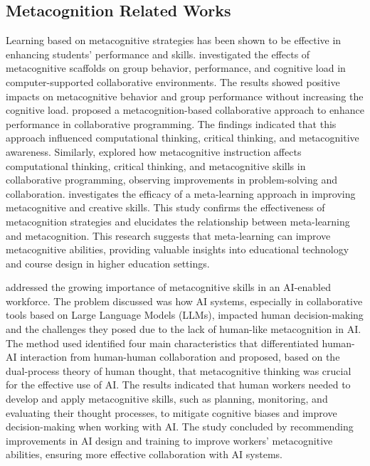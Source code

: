 \documentclass[a4paper,twoside]{article}
\begin{document}
\subsection{Metacognition Related Works}

Learning based on metacognitive strategies has been shown to be effective in
enhancing students’ performance and skills. \cite{Zheng19} investigated the
effects of metacognitive scaffolds on group behavior, performance, and cognitive
load in computer-supported collaborative environments. The results showed
positive impacts on metacognitive behavior and group performance without
increasing the cognitive load. \cite{LiWei23} proposed a metacognition-based
collaborative approach to enhance performance in collaborative programming. The
findings indicated that this approach influenced computational thinking,
critical thinking, and metacognitive awareness. Similarly, \cite{Wang23}
explored how metacognitive instruction affects computational thinking, critical
thinking, and metacognitive skills in collaborative programming, observing
improvements in problem-solving and collaboration. \cite{Khusnul24} investigates
the efficacy of a meta-learning approach in improving metacognitive and creative
skills. This study confirms the effectiveness of metacognition strategies and
elucidates the relationship between meta-learning and metacognition. This
research suggests that meta-learning can improve metacognitive abilities,
providing valuable insights into educational technology and course design in
higher education settings.

\cite{Sidra24} addressed the growing importance of metacognitive skills in an
AI-enabled workforce. The problem discussed was how AI systems, especially in
collaborative tools based on Large Language Models (LLMs), impacted human
decision-making and the challenges they posed due to the lack of human-like
metacognition in AI. The method used identified four main characteristics that
differentiated human-AI interaction from human-human collaboration and proposed,
based on the dual-process theory of human thought, that metacognitive thinking
was crucial for the effective use of AI. The results indicated that human
workers needed to develop and apply metacognitive skills, such as planning,
monitoring, and evaluating their thought processes, to mitigate cognitive biases
and improve decision-making when working with AI. The study concluded by
recommending improvements in AI design and training to improve workers'
metacognitive abilities, ensuring more effective collaboration with AI systems.
\end{document}
